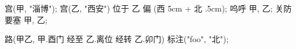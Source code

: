 \usemodule[zhfonts]

宫(甲, "淄博");
宫(乙, "西安") 位于 乙 偏 (西 5cm + 北 .5cm);
呜呼 甲, 乙;
关防要塞 甲, 乙;

路(甲乙, 甲.酉门 经至 乙.离位 经转 乙.卯门) 标注("foo", "北");
\stopuseMPgraphic

\startTEXpage[offset=4pt]
\stopTEXpage
